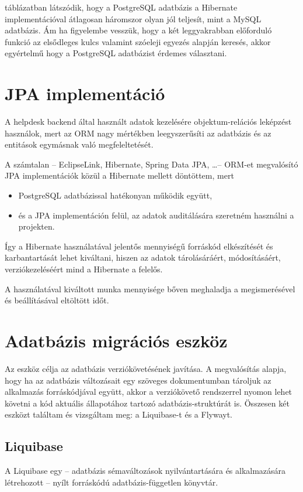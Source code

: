  táblázatban látszódik, hogy a PostgreSQL adatbázis a Hibernate implementációval átlagosan háromszor olyan jól teljesít, mint a MySQL adatbázis. Ám ha figyelembe vesszük, hogy a két leggyakrabban előforduló funkció az elsődleges kulcs valamint szóeleji egyezés alapján keresés, akkor egyértelmű hogy a PostgreSQL adatbázist érdemes választani.


\section{JPA implementáció}
A helpdesk backend által használt adatok kezelésére objektum-relációs leképzést használok, mert az ORM nagy mértékben leegyszerűsíti az adatbázis és az entitások egymásnak való megfeleltetését.


A számtalan --  EclipseLink, Hibernate, Spring Data JPA, \dots --   ORM-et megvalósító JPA implementációk közül a Hibernate mellett döntöttem, mert
\begin{itemize}
	\item PostgreSQL adatbázissal hatékonyan működik együtt,
	\item és a JPA implementáción felül, az adatok auditálására szeretném használni a projekten.
\end{itemize}

Így a Hibernate használatával jelentős mennyiségű forráskód elkészítését és karbantartását lehet kiváltani, hiszen az adatok tárolásáráért, módosításáért, verziókezeléséért mind a Hibernate a felelős.

A használatával kiváltott munka mennyisége bőven meghaladja a megismerésével és beállításával eltöltött időt.


\section{Adatbázis migrációs eszköz}
Az eszköz célja az adatbázis verziókövetésének javítása. A megvalósítás alapja, hogy ha az adatbázis változásait egy szöveges dokumentumban tároljuk az alkalmazás forráskódjával együtt, akkor a verziókövető rendszerrel nyomon lehet követni a kód aktuális állapotához tartozó adatbázis-struktúrát is. Összesen két eszközt találtam és vizsgáltam meg: a Liquibase-t és a Flywayt.

\subsection{Liquibase}
A Liquibase egy --  adatbázis sémaváltozások nyilvántartására és alkalmazására létrehozott --   nyílt forráskódú adatbázis-független könyvtár.
	
